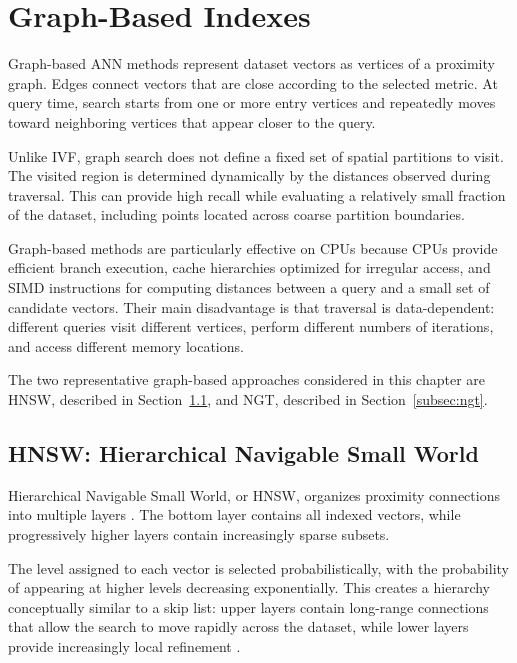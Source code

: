 \section{Graph-Based Indexes}
\label{sec:graph-indexes}

Graph-based ANN methods represent dataset vectors as vertices of a proximity graph. Edges connect vectors that are close according to the selected metric. At query time, search starts from one or more entry vertices and repeatedly moves toward neighboring vertices that appear closer to the query.

Unlike IVF, graph search does not define a fixed set of spatial partitions to visit. The visited region is determined dynamically by the distances observed during traversal. This can provide high recall while evaluating a relatively small fraction of the dataset, including points located across coarse partition boundaries.

Graph-based methods are particularly effective on CPUs because CPUs provide efficient branch execution, cache hierarchies optimized for irregular access, and SIMD instructions for computing distances between a query and a small set of candidate vectors. Their main disadvantage is that traversal is data-dependent: different queries visit different vertices, perform different numbers of iterations, and access different memory locations.

The two representative graph-based approaches considered in this chapter are HNSW, described in Section~\ref{subsec:hnsw}, and NGT, described in Section~\ref{subsec:ngt}.

\subsection{HNSW: Hierarchical Navigable Small World}
\label{subsec:hnsw}

Hierarchical Navigable Small World, or HNSW, organizes proximity connections into multiple layers \cite{hnsw}. The bottom layer contains all indexed vectors, while progressively higher layers contain increasingly sparse subsets.

The level assigned to each vector is selected probabilistically, with the probability of appearing at higher levels decreasing exponentially. This creates a hierarchy conceptually similar to a skip list: upper layers contain long-range connections that allow the search to move rapidly across the dataset, while lower layers provide increasingly local refinement \cite{skiplist}.

